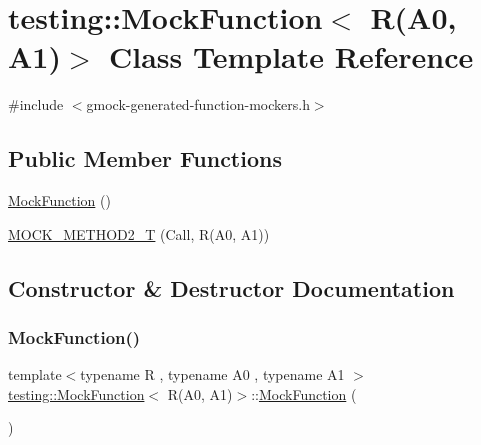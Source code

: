 \hypertarget{classtesting_1_1MockFunction_3_01R_07A0_00_01A1_08_4}{}\section{testing\+::Mock\+Function$<$ R(A0, A1)$>$ Class Template Reference}
\label{classtesting_1_1MockFunction_3_01R_07A0_00_01A1_08_4}


{\ttfamily \#include $<$gmock-\/generated-\/function-\/mockers.\+h$>$}

\subsection*{Public Member Functions}
\begin{DoxyCompactItemize}
\item 
\mbox{\hyperlink{classtesting_1_1MockFunction_3_01R_07A0_00_01A1_08_4_a6a2575d43e9ec4f5d51cd53edbec7f82}{Mock\+Function}} ()
\item 
\mbox{\hyperlink{classtesting_1_1MockFunction_3_01R_07A0_00_01A1_08_4_a5a4d673a3252cab866f0a4fa97486190}{M\+O\+C\+K\+\_\+\+M\+E\+T\+H\+O\+D2\+\_\+T}} (Call, R(A0, A1))
\end{DoxyCompactItemize}


\subsection{Constructor \& Destructor Documentation}
\mbox{\label{classtesting_1_1MockFunction_3_01R_07A0_00_01A1_08_4_a6a2575d43e9ec4f5d51cd53edbec7f82}} 
\subsubsection{\texorpdfstring{MockFunction()}{MockFunction()}}
{\footnotesize\ttfamily template$<$typename R , typename A0 , typename A1 $>$ \\
\mbox{\hyperlink{classtesting_1_1MockFunction}{testing\+::\+Mock\+Function}}$<$ R(A0, A1)$>$\+::\mbox{\hyperlink{classtesting_1_1MockFunction}{Mock\+Function}} (\begin{DoxyParamCaption}{ }\end{DoxyParamCaption})\hspace{0.3cm}{\ttfamily [inline]}}



